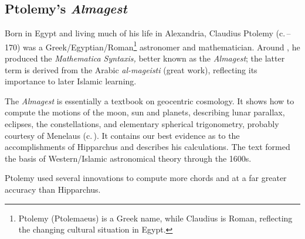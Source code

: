 \clearpage


\subsection{Ptolemy's \emph{Almagest}}

Born in Egypt and living much of his life in Alexandria, Claudius Ptolemy (c.\,--170) was a Greek/Egyptian/Roman\footnote{Ptolemy (Ptolemaeus) is a Greek name, while Claudius is Roman, reflecting the changing cultural situation in Egypt.} astronomer and mathematician. Around , he produced the \emph{Mathematica Syntaxis,} better known as the \emph{Almagest}; the latter term is derived from the Arabic \emph{al-mageisti} (great work), reflecting its importance to later Islamic learning.\par
 
The \emph{Almagest} is essentially a textbook on geocentric cosmology. It shows how to compute the motions of the moon, sun and planets, describing lunar parallax, eclipses, the constellations, and elementary spherical trigonometry, probably courtesy of Menelaus (c.\,). It contains our best evidence as to the accomplishments of Hipparchus and describes his calculations. The text formed the basis of Western/Islamic astronomical theory through the 1600s.



Ptolemy used several innovations to compute more chords and at a far greater accuracy than Hipparchus.

